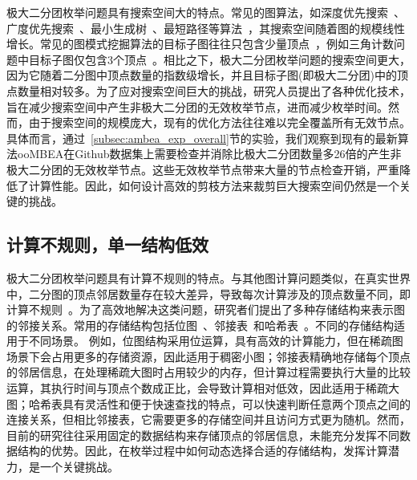 极大二分团枚举问题具有搜索空间大的特点。常见的图算法，如深度优先搜索~\cite{wiki-dfs}、广度优先搜索~\cite{wiki-bfs}、最小生成树~\cite{wiki-mst}、最短路径等算法~\cite{wiki-sssp}，其搜索空间随着图的规模线性增长。常见的图模式挖掘算法的目标子图往往只包含少量顶点~\cite{g2miner22,decomine22,khuzdul23,gamma23}，例如三角计数问题中目标子图仅包含3个顶点~\cite{triangle18}。相比之下，极大二分团枚举问题的搜索空间更大，因为它随着二分图中顶点数量的指数级增长，并且目标子图(即极大二分团)中的顶点数量相对较多。为了应对搜索空间巨大的挑战，研究人员提出了各种优化技术，旨在减少搜索空间中产生非极大二分团的无效枚举节点，进而减少枚举时间。然而，由于搜索空间的规模庞大，现有的优化方法往往难以完全覆盖所有无效节点。具体而言，通过~\ref{subsec:ambea_exp_overall}节的实验，我们观察到现有的最新算法ooMBEA在Github数据集上需要检查并消除比极大二分团数量多26倍的产生非极大二分团的无效枚举节点。这些无效枚举节点带来大量的节点检查开销，严重降低了计算性能。因此，如何设计高效的剪枝方法来裁剪巨大搜索空间仍然是一个关键的挑战。


\subsection{计算不规则，单一结构低效}

极大二分团枚举问题具有计算不规则的特点。与其他图计算问题类似，在真实世界中，二分图的顶点邻居数量存在较大差异，导致每次计算涉及的顶点数量不同，即计算不规则~\cite{Irregularity12}。为了高效地解决这类问题，研究者们提出了多种存储结构来表示图的邻接关系。常用的存储结构包括位图~\cite{lcm04,lcmmbc07,FCA15,FCA21,FCA22}、邻接表~\cite{iMBEA14,PMBE20,ooMBE22}和哈希表~\cite{parMBE18}。不同的存储结构适用于不同场景。
例如，位图结构采用位运算，具有高效的计算能力，但在稀疏图场景下会占用更多的存储资源，因此适用于稠密小图；邻接表精确地存储每个顶点的邻居信息，在处理稀疏大图时占用较少的内存，但计算过程需要执行大量的比较运算，其执行时间与顶点个数成正比，会导致计算相对低效，因此适用于稀疏大图；哈希表具有灵活性和便于快速查找的特点，可以快速判断任意两个顶点之间的连接关系，但相比邻接表，它需要更多的存储空间并且访问方式更为随机。然而，目前的研究往往采用固定的数据结构来存储顶点的邻居信息，未能充分发挥不同数据结构的优势。因此，在枚举过程中如何动态选择合适的存储结构，发挥计算潜力，是一个关键挑战。



